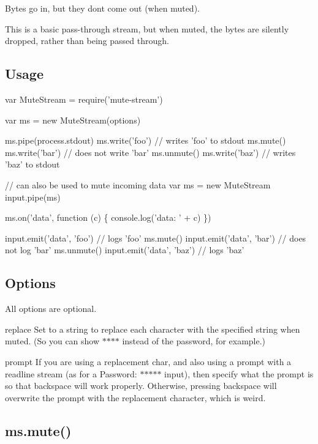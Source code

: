 Bytes go in, but they don\textquotesingle{}t come out (when muted).

This is a basic pass-\/through stream, but when muted, the bytes are silently dropped, rather than being passed through.

\subsection*{Usage}


\begin{DoxyCode}
var MuteStream = require('mute-stream')

var ms = new MuteStream(options)

ms.pipe(process.stdout)
ms.write('foo') // writes 'foo' to stdout
ms.mute()
ms.write('bar') // does not write 'bar'
ms.unmute()
ms.write('baz') // writes 'baz' to stdout

// can also be used to mute incoming data
var ms = new MuteStream
input.pipe(ms)

ms.on('data', function (c) \{
  console.log('data: ' + c)
\})

input.emit('data', 'foo') // logs 'foo'
ms.mute()
input.emit('data', 'bar') // does not log 'bar'
ms.unmute()
input.emit('data', 'baz') // logs 'baz'
\end{DoxyCode}


\subsection*{Options}

All options are optional.


\begin{DoxyItemize}
\item {\ttfamily replace} Set to a string to replace each character with the specified string when muted. (So you can show {\ttfamily $\ast$$\ast$$\ast$$\ast$} instead of the password, for example.)
\item {\ttfamily prompt} If you are using a replacement char, and also using a prompt with a readline stream (as for a {\ttfamily Password\+: $\ast$$\ast$$\ast$$\ast$$\ast$} input), then specify what the prompt is so that backspace will work properly. Otherwise, pressing backspace will overwrite the prompt with the replacement character, which is weird.
\end{DoxyItemize}

\subsection*{ms.\+mute()}

